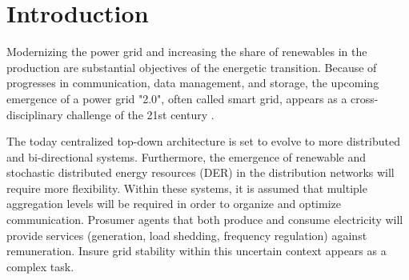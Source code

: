 \documentclass[conference]{IEEEtran}
\begin{document}
\IEEEpeerreviewmaketitle


\section{Introduction}
\label{sec:introduction}

Modernizing the power grid and increasing the share of renewables in the production are substantial objectives of the energetic transition. Because of progresses in communication, data management, and storage, the upcoming emergence of a power grid "2.0", often called smart grid, appears as a cross-disciplinary challenge of the 21st century \cite{Ramchurn}.

The today centralized top-down architecture is set to evolve to more distributed and bi-directional systems. Furthermore, the emergence of renewable and stochastic distributed energy resources (DER) in the distribution networks will require more flexibility. Within these systems, it is assumed that multiple aggregation levels will be required in order to organize and optimize communication. Prosumer agents \cite{Parag2016} that both produce and consume electricity will provide services (generation, load shedding, frequency regulation) against remuneration. Insure grid stability within this uncertain context appears as a complex task. 

\end{document}
